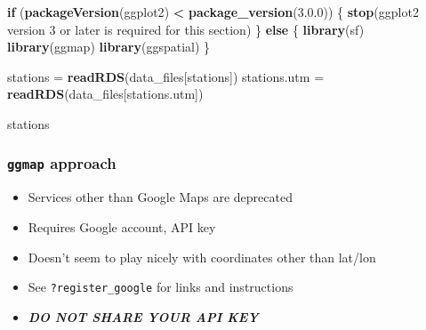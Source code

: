 \documentclass[
]{article}
\newenvironment{Shaded}{\begin{snugshade}}{\end{snugshade}}
\newcommand{\ControlFlowTok}[1]{\textcolor[rgb]{0.13,0.29,0.53}{\textbf{#1}}}
\newcommand{\KeywordTok}[1]{\textcolor[rgb]{0.13,0.29,0.53}{\textbf{#1}}}
\newcommand{\NormalTok}[1]{#1}
\newcommand{\OperatorTok}[1]{\textcolor[rgb]{0.81,0.36,0.00}{\textbf{#1}}}
\newcommand{\StringTok}[1]{\textcolor[rgb]{0.31,0.60,0.02}{#1}}
\providecommand{\tightlist}{%
  \setlength{\itemsep}{0pt}\setlength{\parskip}{0pt}}
\begin{document}
\begin{Shaded}
\begin{Highlighting}[]
\ControlFlowTok{if}\NormalTok{ (}\KeywordTok{packageVersion}\NormalTok{(}\StringTok{\textquotesingle{}ggplot2\textquotesingle{}}\NormalTok{) }\OperatorTok{\textless{}}\StringTok{ }\KeywordTok{package\_version}\NormalTok{(}\StringTok{\textquotesingle{}3.0.0\textquotesingle{}}\NormalTok{)) \{}
    \KeywordTok{stop}\NormalTok{(}\StringTok{\textquotesingle{}ggplot2 version 3 or later is required for this section\textquotesingle{}}\NormalTok{)}
\NormalTok{\} }\ControlFlowTok{else}\NormalTok{ \{}
    \KeywordTok{library}\NormalTok{(sf)}
    \KeywordTok{library}\NormalTok{(ggmap)}
    \KeywordTok{library}\NormalTok{(ggspatial)}
\NormalTok{\}}

\NormalTok{stations =}\StringTok{ }\KeywordTok{readRDS}\NormalTok{(data\_files[}\StringTok{\textquotesingle{}stations\textquotesingle{}}\NormalTok{])}
\NormalTok{stations.utm =}\StringTok{ }\KeywordTok{readRDS}\NormalTok{(data\_files[}\StringTok{\textquotesingle{}stations.utm\textquotesingle{}}\NormalTok{])}

\NormalTok{stations}
\end{Highlighting}
\end{Shaded}

\hypertarget{ggmap-approach}{%
\subsubsection{\texorpdfstring{\texttt{ggmap} approach}{ggmap approach}}\label{ggmap-approach}}

\begin{itemize}
\tightlist
\item
  Services other than Google Maps are deprecated
\item
  Requires Google account, API key
\item
  Doesn't seem to play nicely with coordinates other than lat/lon
\item
  See \texttt{?register\_google} for links and instructions
\item
  \textbf{\emph{DO NOT SHARE YOUR API KEY}}
\end{itemize}
\end{document}
